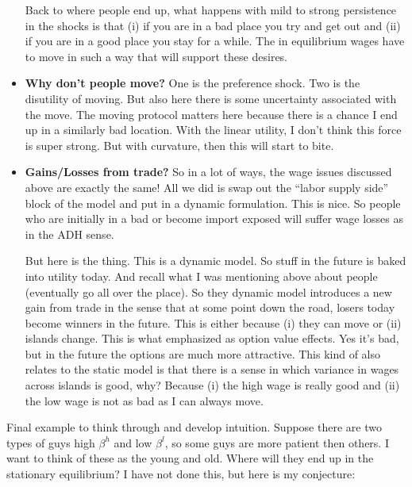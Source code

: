 \documentclass[pdftex,12pt]{article}
\begin{document}
\begin{itemize}
    Back to where people end up, what happens with mild to strong persistence in the shocks is that (i) if you are in a bad place you try and get out and (ii) if you are in a good place you stay for a while. The in equilibrium wages have to move in such a way that will support these desires. 
    
\item \textbf{Why don't people move?} One is the preference shock. Two is the disutility of moving. But also here there is some uncertainty associated with the move. The moving protocol matters here because there is a chance I end up in a similarly bad location. With the linear utility, I don't think this force is super strong. But with curvature, then this will start to bite. 
    
\item \textbf{Gains/Losses from trade?} So in a lot of ways, the wage issues discussed above are exactly the same! All we did is swap out the ``labor supply side'' block of the model and put in a dynamic formulation. This is nice. So people who are initially in a bad or become import exposed will suffer wage losses as in the ADH sense. 
    
    But here is the thing. This is a dynamic model. So stuff in the future is baked into utility today. And recall what I was mentioning above about people (eventually go all over the place). So they dynamic model introduces a new gain from trade in the sense that at some point down the road, losers today become winners in the future. This is either because (i) they can move or (ii) islands change. This is what \citet{artucc2010trade} emphasized as option value effects. Yes it's bad, but in the future the options are much more attractive. This kind of also relates to the static model is that there is a sense in which variance in wages across islands is good, why? Because (i) the high wage is really good and (ii) the low wage is not as bad as I can always move.
  
\end{itemize}
Final example to think through and develop intuition. Suppose there are two types of guys high $\beta^h$ and low $\beta^l$, so some guys are more patient then others. I want to think of these as the young and old. Where will they end up in the stationary equilibrium? I have not done this, but here is my conjecture:
\end{document}
